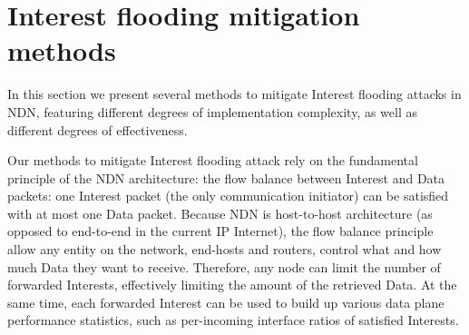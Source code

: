 \section{Interest flooding mitigation methods}
\label{sec:design}



In this section we present several methods to mitigate Interest flooding attacks in NDN, featuring different degrees of implementation complexity, as well as different degrees of effectiveness.





Our methods to mitigate Interest flooding attack rely on the fundamental principle of the NDN architecture: the flow balance between Interest and Data packets: one Interest packet (the only communication initiator) can be satisfied with at most one Data packet.
Because NDN is host-to-host architecture (as opposed to end-to-end in the current IP Internet), the flow balance principle allow any entity on the network, end-hosts and routers, control what and how much Data they want to receive.
Therefore, any node can limit the number of forwarded Interests, effectively limiting the amount of the retrieved Data.
At the same time, each forwarded Interest can be used to build up various data plane performance statistics, such as per-incoming interface ratios of satisfied Interests.

